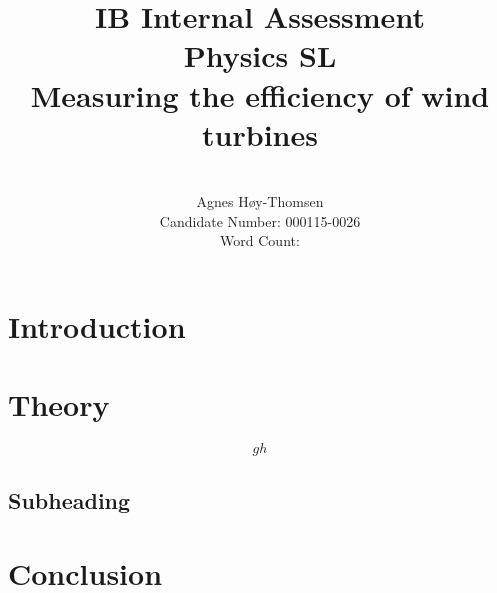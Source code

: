 \documentclass[12pt]{article}
\title{\textbf{IB Internal Assessment}\\\textbf{Physics SL}\\ \vspace{5cm}Measuring the efficiency of wind turbines}
\author{\vspace{5cm}\\Agnes H\o y-Thomsen\\Candidate Number: 000115-0026\\Word Count: }
\begin{document}
\maketitle
\clearpage
\vspace{5cm}
\tableofcontents
\newpage

\section{Introduction} 
\section{Theory}
\begin{equation}
  gh
\label{WRITE A UNIQUE NAME HERE}
\end{equation} 
\subsection{Subheading}
\section{Conclusion}



\nocite{*}
\newpage






\end{document}
